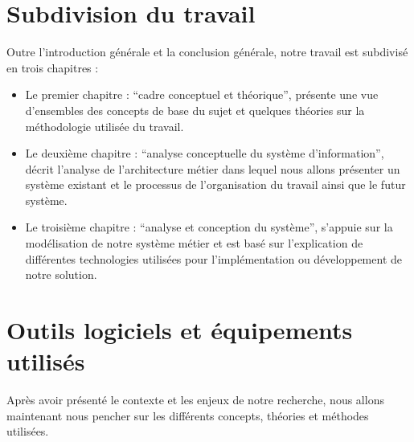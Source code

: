     \section[Subdivision du travail]{Subdivision du travail}
    Outre l’introduction générale et la conclusion générale, notre travail est subdivisé
    en trois chapitres :
    \newline
        \begin{itemize}
            \item [\ding{226}] Le premier chapitre : \enquote{cadre conceptuel et théorique}, présente une vue
            d’ensembles des concepts de base du sujet et quelques théories sur la méthodologie
            utilisée du travail.
            \newline
            \item [\ding{226}] Le deuxième chapitre : \enquote{analyse conceptuelle du système d’information}, 
            décrit l’analyse de l’architecture métier dans lequel nous allons présenter un système existant
            et le processus de l’organisation du travail ainsi que le futur système.
            \newline       
            \item [\ding{226}] Le troisième chapitre : \enquote{analyse et conception du système}, s’appuie sur la
            modélisation de notre système métier et est basé sur l’explication de différentes
            technologies utilisées pour l’implémentation ou développement de notre solution.            
        \end{itemize} 
    \section[Outils logiciels et équipements utilisés]{Outils logiciels et équipements utilisés}
    Après avoir présenté le contexte et les enjeux de notre recherche, nous allons maintenant nous pencher sur
    les différents concepts, théories et méthodes utilisées.